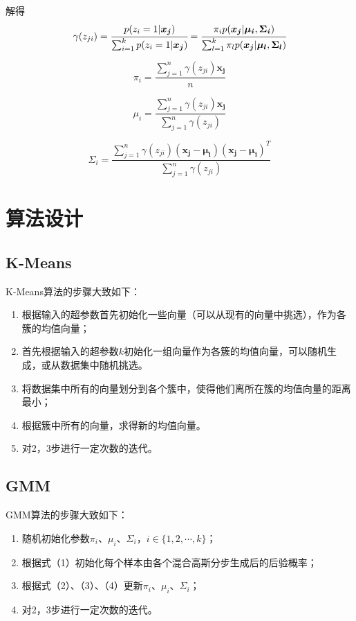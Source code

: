\documentclass[withoutpreface,bwprint]{cumcmthesis}
\begin{document}
解得
\begin{equation}
\gamma(z_{ji})=\cfrac{p(z_{i}=1|\boldsymbol{x_{j}})}{\sum_{i=1}^{k}p(z_{i}=1|\boldsymbol{x_{j}})}=\cfrac{\pi_{i}p(\boldsymbol{x_{j}}|\boldsymbol{\mu_{i}},\boldsymbol{\Sigma_{i}})}{\sum_{l=1}^{k}\pi_{l}p(\boldsymbol{x_{j}}|\boldsymbol{\mu_{l}},\boldsymbol{\Sigma_{l}})}
\end{equation}

\begin{equation}
\pi_{i}=\frac{\sum_{j=1}^{n}\gamma(z_{ji})\boldsymbol{x_{j}}}{n}
\end{equation}

\begin{equation}
\mu_{i}=\frac{\sum_{j=1}^{n}\gamma(z_{ji})\boldsymbol{x_{j}}}{\sum_{j=1}^{n}\gamma(z_{ji})}
\end{equation}

\begin{equation}
\Sigma_{i}=\frac{\sum_{j=1}^{n}\gamma(z_{ji})(\boldsymbol{x_{j}}-\boldsymbol{\mu_{i}})(\boldsymbol{x_{j}}-\boldsymbol{\mu_{i}})^{T}}{\sum_{j=1}^{n}\gamma(z_{ji})}
\end{equation}

\section{算法设计}
\subsection{K-Means}
K-Means算法的步骤大致如下：
\begin{enumerate}
\item 根据输入的超参数首先初始化一些向量（可以从现有的向量中挑选），作为各簇的均值向量；
\item 首先根据输入的超参数$k$初始化一组向量作为各簇的均值向量，可以随机生成，或从数据集中随机挑选。
\item 将数据集中所有的向量划分到各个簇中，使得他们离所在簇的均值向量的距离最小；
\item 根据簇中所有的向量，求得新的均值向量。
\item 对2，3步进行一定次数的迭代。
\end{enumerate}

\subsection{GMM}
GMM算法的步骤大致如下：
\begin{enumerate}
\item 随机初始化参数$\pi_{i}$、$\mu_{i}$、$\Sigma_{i}$，$i \in \{1,2,\cdots,k\}$；
\item 根据式（1）初始化每个样本由各个混合高斯分步生成后的后验概率；
\item 根据式（2）、（3）、（4）更新$\pi_{i}$、$\mu_{i}$、$\Sigma_{i}$；
\item 对2，3步进行一定次数的迭代。
\end{enumerate}
\end{document}

